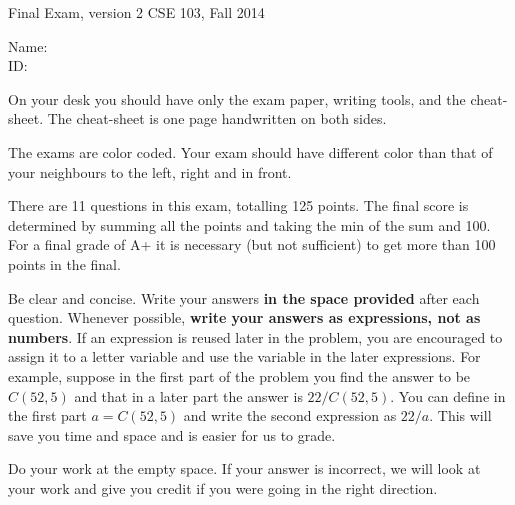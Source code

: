 \documentclass[10pt,dvips]{amsart}
\begin{document}
\voffset=-0.8in
\newpage
{\textbf \Large Final Exam, version 2} \hfill CSE 103, Fall 2014
\\

\vspace{.25in}

Name: \underline{\hspace{3in}}
\\

ID: \underline{\hspace{3.2in}}
\\

\vspace{0.5in}

On your desk you should have only the exam paper, writing tools, and
the cheat-sheet. The cheat-sheet is one page handwritten on both sides.

The exams are color coded. Your exam should have different color 
than that of your neighbours to the left, right and in front.

There are 11 questions in this exam, totalling 125 points.  The final
score is determined by summing all the points and taking the min of
the sum and 100. For a final grade of A+ it is necessary (but not
sufficient) to get more than 100 points in the final. 

Be clear and concise. Write your answers {\bf in the space provided}
after each question. Whenever possible, {\bf write your answers
as expressions, not as numbers}. If an expression is reused
later in the problem, you are encouraged to assign it to a letter
variable and use the variable in the later expressions. For example,
suppose in the first part of the problem you find the answer to be
$C(52,5)$ and that in a later part the answer is $22/C(52,5)$. You can
define in the first part $a=C(52,5)$ and write the second expression
as $22/a$. This will save you time and space and is easier for us to
grade.

Do your work at the empty space. If your answer is incorrect, we will
look at your work and give you credit if you were going in the right direction.

\vspace{0.2in}
\end{document}
